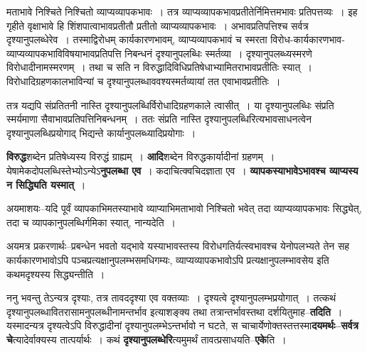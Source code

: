 \documentclass[article,12pt,a4paper]{memoir}
\begin{document}
	  \pstart मताभावे निश्चिते निश्चितो व्याप्यव्यापकभावः । तत्र व्याप्यव्यापकभावप्रतीतेर्निमित्तमभावः प्रतिपत्तव्यः । इह गृहीते वृक्षाभावे हि शिंशपात्वाभावप्रतीतौ प्रतीतो व्याप्यव्यापकभावः । अभावप्रतिपत्तिश्च सर्वत्र दृश्यानुपलब्धेरेव । तस्माद्विरोधम् कार्यकारणभावम्, व्याप्यव्यापकभावं च स्मरता विरोध-कार्यकारणभाव-व्याप्यव्यापकभाविविषयाभावप्रतिपत्ति निबन्धनं दृश्यानुपलब्धिः स्मर्तव्या । दृश्यानुपलब्ध्यस्मरणे विरोधादीनामस्मरणम् । तथा च सति न विरुद्धादिविधिप्रतिषेधाभ्यामितराभावप्रतीतिः स्यात् । विरोधादिग्रहणकालभाविन्यां च दृश्यानुपलब्धाववश्यस्मर्तव्यायां तत एवाभावप्रतीतिः ।
	\pend
        

	  \pstart तत्र यद्यपि संप्रतितनी नास्ति दृश्यानुपलब्धिर्विरोधादिग्रहणकाले त्वासीत् । या दृश्यानुपलब्धिः संप्रति स्मर्यमाणा सैवाभावप्रतिपत्तिनिबन्धनम् । ततः संप्रति नास्ति दृश्यानुपलब्धिरित्यभावसाधनत्वेन दृश्यानुपलब्धिप्रयोगाद् भिद्यन्ते कार्यानुपलब्ध्यादिप्रयोगाः ।
	\pend
      
	  \endgroup
	

	  \pstart \textbf{विरुद्ध}शब्देन प्रतिषेध्यस्य विरुद्धं ग्राह्यम् । \textbf{आदि}शब्देन विरुद्धकार्यादीनां ग्रहणम् । येषामेकदोपलब्धिस्तेभ्योऽन्येऽ\textbf{नुपलब्धा एव} । कदाचित्क्वचिदज्ञाता एव । \textbf{व्यापकस्याभावेऽभावश्च व्याप्यस्य न सिद्ध्यिति यस्मात्} ।
	\pend
      

	  \pstart अयमाशयः--यदि पूर्वं व्यापकाभिमतस्याभावे व्याप्याभिमताभावो निश्चितो भवेत् तदा व्याप्यव्यापकभावः सिद्ध्येत्, तदा च व्यापकानुपलब्धिर्गमिका स्यात्, नान्यदेति ।
	\pend
      

	  \pstart अयमत्र प्रकरणार्थः--प्रबन्धेन भवतो यद्भावे यस्याभावस्तस्य विरोधगतिर्यत्स्वभावश्च येनोपलभ्यते तेन सह कार्यकारणभावोऽपि पञ्चप्रत्यक्षानुपलम्भसमधिगम्यः, व्याप्यव्यापकभावोऽपि प्रत्यक्षानुपलम्भावसेय इति कथमदृश्यस्य सिद्ध्यन्तीति ।
	\pend
      

	  \pstart ननु भवन्तु तेऽन्यत्र दृश्याः, तत्र तावददृश्या एव वक्तव्याः । दृश्यत्वे दृश्यानुपलम्भप्रयोगात् । तत्कथं दृश्यानुपलब्धावितरासामनुपलब्धीनामन्तर्भाव इत्याशङ्क्य तथा तत्रान्तर्भावस्तथा दर्शयितुमाह--\textbf{तदिति} । यस्मादन्यत्र दृश्यत्वेऽपि विरुद्धादीनां दृश्यानुपलम्भेऽन्तर्भावो न घटते, स चाचार्येणोक्तस्तत्तस्मा\textbf{दयमर्थः--सर्वत्र चे}त्यादेर्वाक्यस्य तात्पर्यार्थः । कथं \textbf{दृश्यानुपलब्धेरि}त्यमुमर्थं तावत्प्रसाधयति--\textbf{एके}ति ।
	\pend
      
\end{document}
